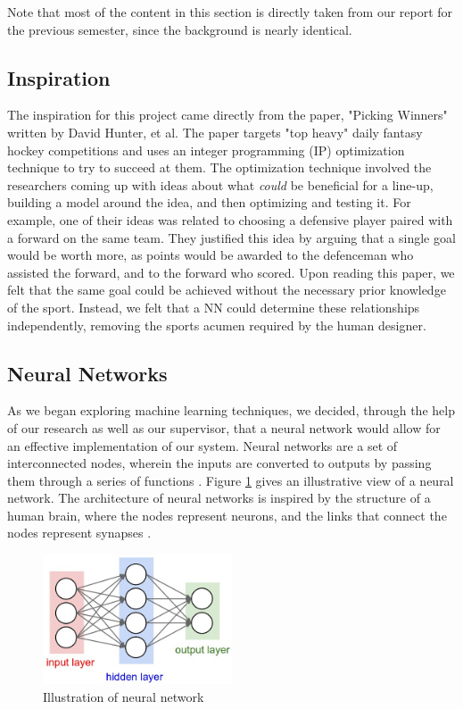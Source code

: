 Note that most of the content in this section is directly taken from our report for the previous semester, since the background is nearly identical.
\subsection{Inspiration}
The inspiration for this project came directly from the paper, "Picking Winners" written by David Hunter, et al. The paper targets "top heavy" daily fantasy hockey competitions and uses an integer programming (IP) optimization technique to try to succeed at them. The optimization technique involved the researchers coming up with ideas about what \textit{could} be beneficial for a line-up, building a model around the idea, and then optimizing and testing it. For example, one of their ideas was related to choosing a defensive player paired with a forward on the same team. They justified this idea by arguing that a single goal would be worth more, as points would be awarded to the defenceman who assisted the forward, and to the forward who scored.  Upon reading this paper, we felt that the same goal could be achieved without the necessary prior knowledge of the sport. Instead, we felt that a NN could determine these relationships independently, removing the sports acumen required by the human designer.

\subsection{Neural Networks}
As we began exploring machine learning techniques, we decided, through the help of our research as well as our supervisor, that a neural network would allow for an effective implementation of our system. Neural networks are a set of interconnected nodes, wherein the inputs are converted to outputs by passing them through a series of functions \cite{neural_net}. Figure \ref{fig:neural_net} gives an illustrative view of a neural network. The architecture of neural networks is inspired by the structure of a human brain, where the nodes represent neurons, and the links that connect the nodes represent synapses \cite{neural_net}.

\begin{figure}[ht]
    \centering
    \includegraphics[width=0.50\textwidth]{figures/neural_net}
    \caption{Illustration of neural network \cite{neural_net} }
    \label{fig:neural_net}
\end{figure}

